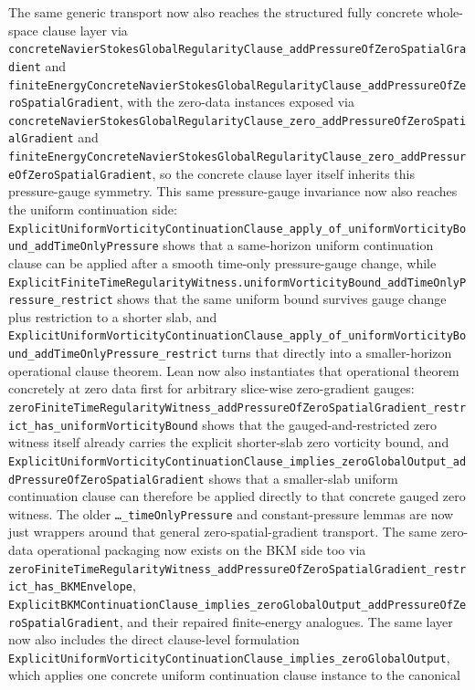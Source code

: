 \documentclass[11pt]{article}
\begin{document}
The same generic transport now also reaches the structured fully concrete
whole-space clause layer via
\texttt{concreteNavierStokesGlobalRegularityClause\_addPressureOfZeroSpatialGradient}
and
\texttt{finiteEnergyConcreteNavierStokesGlobalRegularityClause\_addPressureOfZeroSpatialGradient},
with the zero-data instances exposed via
\texttt{concreteNavierStokesGlobalRegularityClause\_zero\_addPressureOfZeroSpatialGradient}
and
\texttt{finiteEnergyConcreteNavierStokesGlobalRegularityClause\_zero\_addPressureOfZeroSpatialGradient},
so the concrete clause layer itself inherits this pressure-gauge symmetry.
This same pressure-gauge invariance now also reaches the uniform continuation side:
\texttt{ExplicitUniformVorticityContinuationClause\_apply\_of\_uniformVorticityBound\_addTimeOnlyPressure}
shows that a same-horizon uniform continuation clause can be applied after a
smooth time-only pressure-gauge change, while
\texttt{ExplicitFiniteTimeRegularityWitness.uniformVorticityBound\_addTimeOnlyPressure\_restrict}
shows that the same uniform bound survives gauge change plus restriction to a
shorter slab, and
\texttt{ExplicitUniformVorticityContinuationClause\_apply\_of\_uniformVorticityBound\_addTimeOnlyPressure\_restrict}
turns that directly into a smaller-horizon operational clause theorem.  Lean
now also instantiates that operational theorem concretely at zero data first
for arbitrary slice-wise zero-gradient gauges:
\texttt{zeroFiniteTimeRegularityWitness\_addPressureOfZeroSpatialGradient\_restrict\_has\_uniformVorticityBound}
shows that the gauged-and-restricted zero witness itself already carries the
explicit shorter-slab zero vorticity bound, and
\texttt{ExplicitUniformVorticityContinuationClause\_implies\_zeroGlobalOutput\_addPressureOfZeroSpatialGradient}
shows that a smaller-slab uniform continuation clause can therefore be applied
directly to that concrete gauged zero witness.  The older
\texttt{\dots\_timeOnlyPressure} and constant-pressure lemmas are now just
wrappers around that general zero-spatial-gradient transport.  The same
zero-data operational packaging now exists on the BKM side too via
\texttt{zeroFiniteTimeRegularityWitness\_addPressureOfZeroSpatialGradient\_restrict\_has\_BKMEnvelope},
\texttt{ExplicitBKMContinuationClause\_implies\_zeroGlobalOutput\_addPressureOfZeroSpatialGradient},
and their repaired finite-energy analogues.
The same layer now also includes the direct clause-level formulation
\texttt{ExplicitUniformVorticityContinuationClause\_implies\_zeroGlobalOutput},
which applies one concrete uniform continuation clause instance to the canonical
\end{document}

